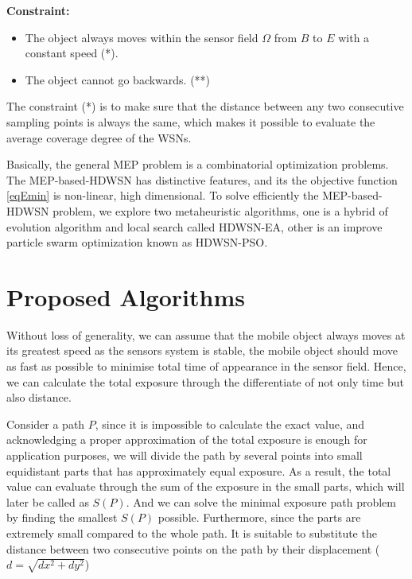 \documentclass[final]{elsarticle}
\begin{document}
\textbf{Constraint:}	
\begin{itemize}
	\item The object always moves within the sensor field $\Omega $ from $B$ to $E$ with a constant speed (*).
	\item The object cannot go backwards. (**)
\end{itemize}
The constraint (*) is to make sure that the distance between any two consecutive sampling points is always the same, which makes it possible to evaluate the average coverage degree of the WSNs.
	
Basically, the general MEP problem is a combinatorial optimization problems. The MEP-based-HDWSN has distinctive features, and its the objective function \eqref{eqEmin} is non-linear, high dimensional. To solve efficiently the MEP-based-HDWSN problem, we explore two metaheuristic algorithms, one is a hybrid of evolution algorithm and local search called HDWSN-EA, other is an improve particle swarm optimization known as HDWSN-PSO.
\section{Proposed Algorithms}

Without loss of generality, we can assume that the mobile object always moves at its greatest speed as the sensors system is stable, the mobile object should move as fast as possible to minimise total time of appearance in the sensor field. Hence, we can calculate the total exposure through the differentiate of not only time but also distance. %

Consider a path $P$, since it is impossible to calculate the exact value, and acknowledging a proper approximation of the total exposure is enough for application purposes, we will divide the path by several points into small equidistant parts that has approximately equal exposure. As a result, the total value can evaluate through the sum of the exposure in the small parts, which will later be called as $S(P)$. And we can solve the minimal exposure path problem by finding the smallest $S(P)$ possible. Furthermore, since the parts are extremely small compared to the whole path. It is suitable to substitute the distance between two consecutive points on the path by their displacement ($d = \sqrt{dx ^ 2 + dy ^ 2}$)
\end{document}
